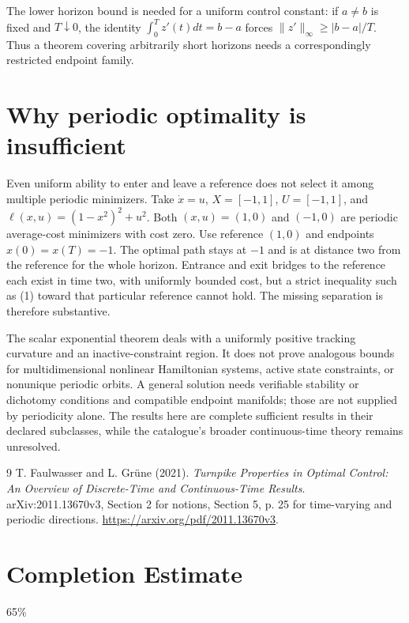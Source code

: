 \documentclass[11pt,a4paper]{article}
\theoremstyle{definition}
\theoremstyle{remark}
\begin{document}
The lower horizon bound is needed for a uniform control constant: if $a\ne b$ is fixed and $T\downarrow0$, the identity $\int_0^Tz'(t)dt=b-a$ forces $\|z'\|_\infty\ge|b-a|/T$. Thus a theorem covering arbitrarily short horizons needs a correspondingly restricted endpoint family.

\section{Why periodic optimality is insufficient}
Even uniform ability to enter and leave a reference does not select it among multiple periodic minimizers. Take $\dot x=u$, $X=[-1,1]$, $U=[-1,1]$, and
$\ell(x,u)=(1-x^2)^2+u^2$. Both $(x,u)=(1,0)$ and $(-1,0)$ are periodic average-cost minimizers with cost zero. Use reference $(1,0)$ and endpoints $x(0)=x(T)=-1$. The optimal path stays at $-1$ and is at distance two from the reference for the whole horizon. Entrance and exit bridges to the reference each exist in time two, with uniformly bounded cost, but a strict inequality such as (1) toward that particular reference cannot hold. The missing separation is therefore substantive.

The scalar exponential theorem deals with a uniformly positive tracking curvature and an inactive-constraint region. It does not prove analogous bounds for multidimensional nonlinear Hamiltonian systems, active state constraints, or nonunique periodic orbits. A general solution needs verifiable stability or dichotomy conditions and compatible endpoint manifolds; those are not supplied by periodicity alone. The results here are complete sufficient results in their declared subclasses, while the catalogue's broader continuous-time theory remains unresolved.
\begin{thebibliography}{9}
 T. Faulwasser and L. Gr\"une (2021).
\emph{Turnpike Properties in Optimal Control: An Overview of Discrete-Time and Continuous-Time Results}. arXiv:2011.13670v3, Section 2 for notions, Section 5, p. 25 for time-varying and periodic directions.
\url{https://arxiv.org/pdf/2011.13670v3}.
\end{thebibliography}

\section{Completion Estimate}
65\%
\end{document}
